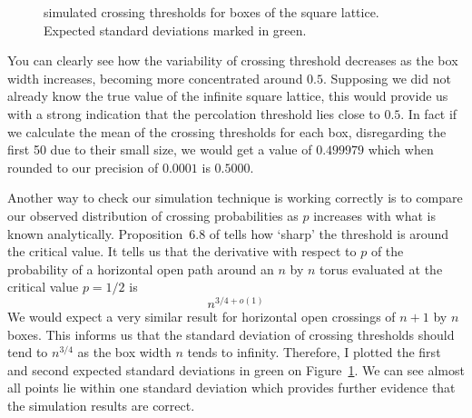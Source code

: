 \documentclass[a4paper,11pt]{article}
\theoremstyle{definition}
\begin{document}
\begin{landscape}
	\begin{figure}
		\centering
		\caption{simulated crossing thresholds for  boxes of the square lattice. Expected standard deviations marked in green.}
		\label{fig:thresholdplot2}
	\end{figure}
	\end{landscape}

You can clearly see how the variability of crossing threshold decreases as the box width increases, becoming more concentrated around $0.5$. Supposing we did not already know the true value of the infinite square lattice, this would provide us with a strong indication that the percolation threshold lies close to $0.5$. In fact if we calculate the mean of the crossing thresholds for each box, disregarding the first 50 due to their small size, we would get a value of $0.499979$ which when rounded to our precision of $0.0001$ is $0.5000$.

Another way to check our simulation technique is working correctly is to compare our observed distribution of crossing probabilities as $p$ increases with what is known analytically. Proposition~6.8 of \cite{garban2014noise} tells how `sharp' the threshold is around the critical value. It tells us that the derivative with respect to $p$ of the probability of a horizontal open path around an $n$ by $n$ torus evaluated at the critical value $p=1/2$ is 
$$n^{3/4 + o(1)}$$
We would expect a very similar result for horizontal open crossings of $n+1$ by $n$ boxes. This informs us that the standard deviation of crossing thresholds should tend to $n^{3/4}$ as the box width $n$ tends to infinity. Therefore, I plotted the first and second expected standard deviations in green on Figure~\ref*{fig:thresholdplot2}. We can see almost all points lie within one standard deviation which provides further evidence that the simulation results are correct.
\end{document}
